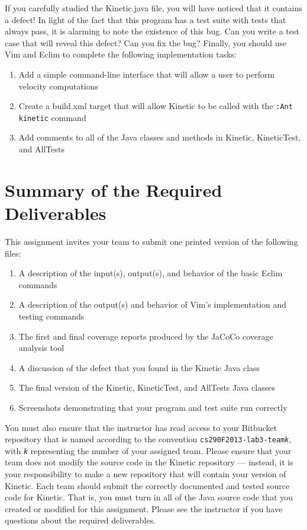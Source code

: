 If you carefully studied the Kinetic.java file, you will have noticed that it contains a defect! In light of the fact
that this program has a test suite with tests that always pass, it is alarming to note the existence of this bug. 
Can you write a test case that will reveal this defect? Can you fix the bug?  Finally, you should use Vim and Eclim to
complete the following implementation tasks:

\vspace*{-.1in}
\begin{enumerate}
	\item Add a simple command-line interface that will allow a user to perform velocity computations
	\item Create a build.xml target that will allow Kinetic to be called with the {\tt :Ant kinetic} command
	\item Add comments to all of the Java classes and methods in Kinetic, KineticTest, and AllTests
\end{enumerate}

\section*{Summary of the Required Deliverables}

This assignment invites your team to submit one printed version of the following files:

\begin{enumerate}
	
	\item A description of the input(s), output(s), and behavior of the basic Eclim commands 
	\item A description of the output(s) and behavior of Vim's implementation and testing commands
	\item The first and final coverage reports produced by the JaCoCo coverage analysis tool
	\item A discussion of the defect that you found in the Kinetic Java class
	\item The final version of the Kinetic, KineticTest, and AllTests Java classes
	\item Screenshots demonstrating that your program and test suite run correctly
\end{enumerate}

You must also ensure that the instructor has read access to your Bitbucket repository that is named according to the
convention {\tt cs290F2013-lab3-team{\em k}}, with {\tt {\em k}} representing the number of your assigned team.  Please
ensure that your team does not modify the source code in the Kinetic repository --- instead, it is your responsibility
to make a new repository that will contain your version of Kinetic.  Each team should submit the correctly documented
and tested source code for Kinetic.  That is, you must turn in all of the Java source code that you created or modified
for this assignment. Please see the instructor if you have questions about the required deliverables.


